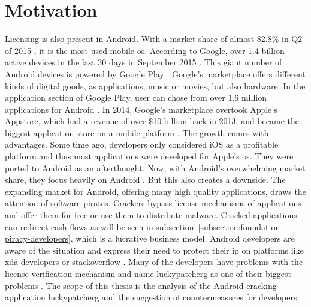 \section{Motivation} \label{subsection:introduction-motivation}
Licensing is also present in Android.
With a market share of almost 82.8\% in Q2 of 2015 \cite{androidShare}, it is the most used mobile \gls{os}.
According to Google, over 1.4 billion active devices in the last 30 days in September 2015 \cite{androidDevices}.
This giant number of Android devices is powered by Google Play \cite{googlePlay}.
Google's marketplace offers different kinds of digital goods, as applications, music or movies, but also hardware.
In the application section of Google Play, user can chose from over 1.6 million applications for Android \cite{statistaAppStore}.
In 2014, Google's marketplace overtook Apple's Appstore, which had a revenue of over \$10 billion back in 2013, and became the biggest application store on a mobile platform \cite{wiwoValue}.
\newline
The growth comes with advantages.
Some time ago, developers only considered iOS as a profitable platform and thus most applications were developed for Apple's \gls{os}.
They were ported to Android as an afterthought.
Now, with Android's overwhelming market share, they focus heavily on Android \cite{businessProfit}.
But this also creates a downside.
The expanding market for Android, offering many high quality applications, draws the attention of software pirates.
Crackers bypass license mechanisms of applications and offer them for free or use them to distribute malware.
Cracked applications can redirect cash flows as will be seen in subsection~\ref{subsection:foundation-piracy-developers}, which is a lucrative business model.
\newline
Android developers are aware of the situation \cite{developersPiracy} and express their need to protect their \gls{ip} on platforms like xda-developers \cite{xdaPiracy} or stackoverflow \cite{stackoverflowPiracy}.
Many of the developers have problems with the license verification mechanism and name \gls{luckypatcherg} as one of their biggest problems \cite{stackoverflowLucky}.
\newline
\newline
The scope of this thesis is the analysis of the Android cracking application \gls{luckypatcherg} and the suggestion of countermeasures for developers.
